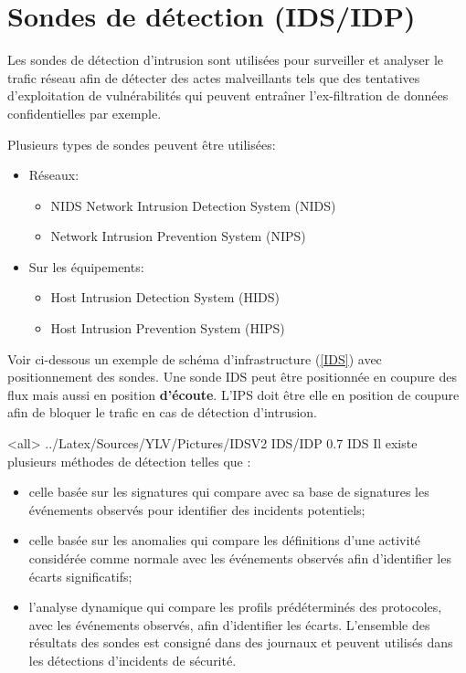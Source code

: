 \section{Sondes de détection (IDS/IDP)}

Les sondes de détection d'intrusion sont utilisées pour surveiller et analyser le trafic réseau afin de détecter des actes malveillants tels que des tentatives d'exploitation de vulnérabilités qui peuvent entraîner l'ex-filtration de données confidentielles par exemple. 

Plusieurs types de sondes peuvent être utilisées:
\begin{itemize}
\item Réseaux:
\begin{itemize}
\item NIDS Network Intrusion Detection System (NIDS)
\item Network Intrusion Prevention System (NIPS)
\end{itemize}
\item Sur les équipements:
\begin{itemize}
\item Host Intrusion Detection System (HIDS)
\item Host Intrusion Prevention System (HIPS)
\end{itemize}
\end{itemize}
Voir ci-dessous un exemple de schéma d'infrastructure (\ref{IDS}) avec positionnement des sondes.
Une sonde IDS peut être positionnée en coupure des flux mais aussi en position \textbf{d'écoute}.
L'IPS doit être elle en position de coupure afin de bloquer le trafic en cas de détection d'intrusion.

\mode<all>{\picframe
{../Latex/Sources/YLV/Pictures/IDSV2}%
{IDS/IDP} %
{0.7} %
{IDS} %
}
Il existe plusieurs méthodes de détection telles que :
\begin{itemize}
\item celle basée sur les signatures qui compare avec sa base de signatures les événements observés pour identifier des incidents potentiels;
\item celle basée sur les anomalies qui compare les définitions d'une activité considérée comme normale avec les événements observés afin d'identifier les écarts significatifs;
\item l'analyse dynamique qui compare les profils prédéterminés des protocoles, avec les événements observés, afin d'identifier les écarts.
L'ensemble des résultats des sondes est consigné dans des journaux et peuvent utilisés dans les détections d'incidents de sécurité. 
\end{itemize}

